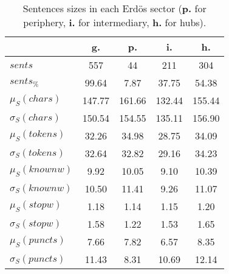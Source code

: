 \begin{table}[h!]
\begin{center}
\begin{tabular}{| l || c | c | c | c |}\hline
 & {\bf g.} & {\bf p.} & {\bf i.} & {\bf h.} \\\hline\hline
$sents$ & 557  & 44  & 211  & 304 \\
$sents_{\%}$ & 99.64  & 7.87  & 37.75  & 54.38 \\\hline
$\mu_S(chars)$ & 147.77  & 161.66  & 132.44  & 155.44 \\
$\sigma_S(chars)$ & 150.54  & 154.55  & 135.11  & 156.90 \\\hline
$\mu_S(tokens)$ & 32.26  & 34.98  & 28.75  & 34.09 \\
$\sigma_S(tokens)$ & 32.64  & 32.82  & 29.16  & 34.23 \\\hline
$\mu_S(knownw)$ & 9.92  & 10.05  & 9.10  & 10.39 \\
$\sigma_S(knownw)$ & 10.50  & 11.41  & 9.26  & 11.07 \\\hline
$\mu_S(stopw)$ & 1.18  & 1.14  & 1.15  & 1.20 \\
$\sigma_S(stopw)$ & 1.58  & 1.22  & 1.53  & 1.65 \\\hline
$\mu_S(puncts)$ & 7.66  & 7.82  & 6.57  & 8.35 \\
$\sigma_S(puncts)$ & 11.43  & 8.31  & 10.69  & 12.14 \\\hline
\end{tabular}
\caption{Sentences sizes in each Erd\"os sector ({{\bf p.}} for periphery, {{\bf i.}} for intermediary, {{\bf h.}} for hubs).}
\end{center}
\end{table}